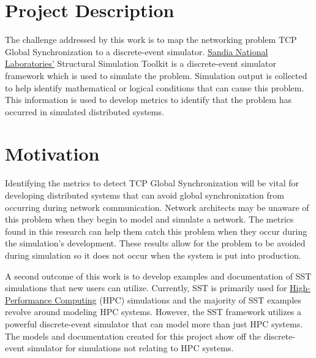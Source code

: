 \documentclass{article}
\begin{document}
\section{Project Description} %

The challenge addressed by this work is to map the networking problem TCP Global Synchronization to a discrete-event simulator. \href{https://www.sandia.gov/}{Sandia National Laboratories'} Structural Simulation Toolkit is a discrete-event simulator framework which is used to simulate the problem. Simulation output is collected to help identify mathematical or logical conditions that can cause this problem. This information is used to develop metrics to identify that the problem has occurred in simulated distributed systems. 


\section{Motivation} %

Identifying the metrics to detect TCP Global Synchronization will be vital for developing distributed systems that can avoid global synchronization from occurring during network communication. Network architects may be unaware of this problem when they begin to model and simulate a network. The metrics found in this research can help them catch this problem when they occur during the simulation's development. These results allow for the problem to be avoided during simulation so it does not occur when the system is put into production.

A second outcome of this work is to develop examples and documentation of SST simulations that new users can utilize. Currently, SST is primarily used for \href{https://en.wikipedia.org/wiki/High-performance_computing}{High-Performance Computing} (HPC) simulations and the majority of SST examples revolve around modeling HPC systems. However, the SST framework utilizes a powerful discrete-event simulator that can model more than just HPC systems. The models and documentation created for this project show off the discrete-event simulator for simulations not relating to HPC systems.
\end{document}
